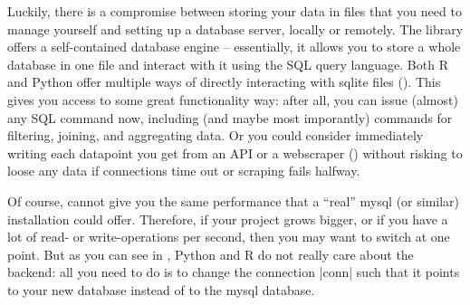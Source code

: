 Luckily, there is a compromise between storing your data in files
that you need to manage yourself and setting up a database server,
locally or remotely. The library  offers a self-contained
database engine -- essentially, it allows you to store a whole
database in one file and interact with it using the SQL query language.
Both R and Python offer multiple ways of directly interacting with
sqlite files (). This gives you access to some great
functionality way: after all, you can issue (almost) any SQL command
now, including (and maybe most imporantly) commands for filtering,
joining, and aggregating data. Or you could consider immediately writing
each datapoint you get from an API or a webscraper ()
without risking to loose any data if connections time out or scraping
fails halfway.


Of course,  cannot give you the same performance that a ``real'' mysql (or similar) installation could offer. Therefore, if your project grows bigger, or if you have a lot of read- or
write-operations per second, then you may want to switch at one
point. But as you can see in , Python and R do not
really care about the backend: all you need to do is to change the
connection |conn| such that it points to your new database instead of
to the mysql database.



